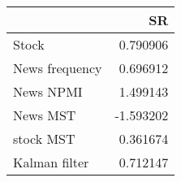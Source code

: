 \begin{tabular}{lr}
\toprule
{} &        SR \\
\midrule
Stock          &  0.790906 \\
News frequency &  0.696912 \\
News NPMI      &  1.499143 \\
News MST       & -1.593202 \\
stock MST      &  0.361674 \\
Kalman filter  &  0.712147 \\
\bottomrule
\end{tabular}
